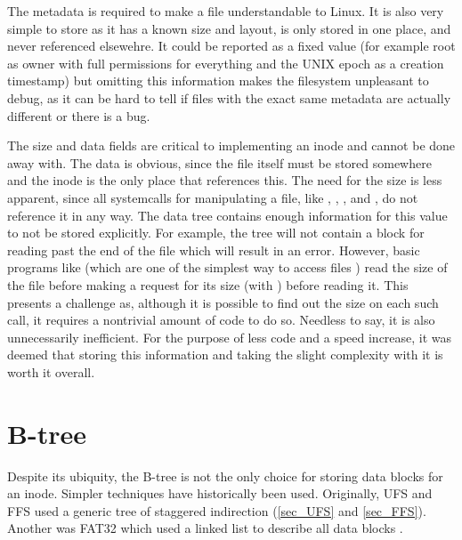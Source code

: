         The metadata is required to make a file understandable to Linux. It is
        also very simple to store as it has a known size and layout, is only
        stored in one place, and never referenced elsewehre. It could be
        reported as a fixed value (for example root as owner with full
        permissions for everything and the UNIX epoch as a creation timestamp)
        but omitting this information makes the filesystem unpleasant to debug,
        as it can be hard to tell if files with the exact same metadata are
        actually different or there is a bug.

        The size and data fields are critical to implementing an inode and
        cannot be done away with. The data is obvious, since the file itself
        must be stored somewhere and the inode is the only place that
        references this. The need for the size is less apparent, since all
        systemcalls for manipulating a file, like ,
        , ,  and ,
        do not reference it in any way. The data tree contains enough
        information for this value to not be stored explicitly.  For example,
        the tree will not contain a block for reading past the end of the file
        which will result in an error. However, basic programs like
         (which are one of the simplest way to access files
        \cite{https://tldp.org/HOWTO/Linux+IPv6-HOWTO/ch11s01.html}) read the
        size of the file before making a request for its size (with
        ) before reading it. This presents a challenge as,
        although it is possible to find out the size on each such call, it
        requires a nontrivial amount of code to do so. Needless to say, it is
        also unnecessarily inefficient. For the purpose of less code and a
        speed increase, it was deemed that storing this information and taking
        the slight complexity with it is worth it overall.

    \section{B-tree}
        \label{sec_design_btree}

        Despite its ubiquity, the B-tree is not the only choice for storing
        data blocks for an inode. Simpler techniques have historically been
        used. Originally, UFS and FFS used a generic tree of staggered
        indirection (\ref{sec_UFS} and \ref{sec_FFS}). Another was FAT32 which
        used a linked list to describe all data blocks \cite{needed}.

